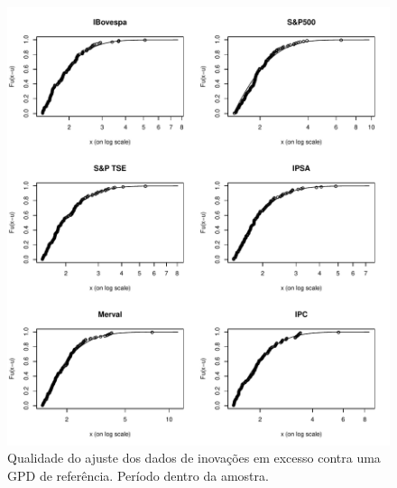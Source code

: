 \documentclass[1p]{elsarticle}
\theoremstyle{definition}
\begin{document}
\begin{figure}[H]
	\centering
	\includegraphics[width=1\linewidth]{figs/artigo-gpdfit}
	\caption{Qualidade do ajuste dos dados de inovações em excesso contra uma GPD de referência. Período dentro da amostra.}
	\label{fig:artigo-gpdfit}
\end{figure}
\end{document}
